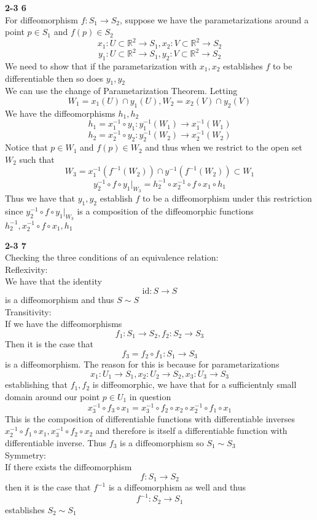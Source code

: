 \documentclass[12pt]{article}
\newenvironment{ques}[1]{\textbf{#1}\vspace{1 mm}\\ }{\bigskip}
\theoremstyle{definition}
\newcommand{\R}{\mathbb R}
\newcommand{\id}{\text{id}}
\begin{document}
\begin{ques}{2-3 6}
	For diffeomorphism $f: S_1 \to S_2$, suppose we have the parametarizations
	around a point $p \in S_1$ and $f(p) \in S_2$
	$$x_1: U \subset \R^2 \to S_1, x_2: V \subset \R^2 \to S_2$$
	$$y_1: U \subset \R^2 \to S_1, y_2: V \subset \R^2 \to S_2$$
	We need to show that if the parametarization with $x_1, x_2$ establishes
	$f$ to be differentiable then so does $y_1, y_2$\\
	We can use the change of Parametarization Theorem. Letting 
	$$W_1 = x_1(U) \cap y_1(U), W_2 = x_2(V) \cap y_2(V)$$
	We have the diffeomorphisms $h_1, h_2$
	$$h_1 = x_1^{-1} \circ y_1: y_1^{-1}(W_1) \to x_1^{-1}(W_1)$$
	$$h_2 = x_2^{-1} \circ y_2: y_2^{-1}(W_2) \to x_2^{-1}(W_2)$$
	Notice that $p \in W_1$ and $f(p) \in W_2$ and thus when we restrict to the
	open set $W_2$ such that 
	$$W_3 = x_1^{-1}(f^{-1}(W_2))\cap y^{-1}(f^{-1}(W_2)) \subset W_1$$
	$$y_2^{-1} \circ f \circ y_1|_{W_3} = h_2^{-1} \circ x_2^{-1} \circ f \circ x_1
	\circ h_1$$
	Thus we have that $y_1, y_2$ establish $f$ to be a diffeomorphism under
	this restriction since $y_2^{-1} \circ f \circ y_1|_{W_3}$ is a composition
	of the diffeomorphic functions $h_2^{-1}, x_2^{-1} \circ f \circ x_1, h_1$
\end{ques}

\begin{ques}{2-3 7}
	Checking the three conditions of an equivalence relation:\\
	Reflexivity:\\
	We have that the identity 
	$$\id : S \to S$$
	is a diffeomorphism and thus $S \sim S$\\
	Transitivity:\\
	If we have the diffeomorphisms
	$$f_1:S_1 \to S_2, f_2:S_2 \to S_3$$
	Then it is the case that 
	$$f_3 = f_2 \circ f_1 :S_1 \to S_3$$
	is a diffeomorphism. The reason for this is because for parametarizations
	$$x_1: U_1 \to S_1, x_2: U_2 \to S_2, x_3:U_3 \to S_3$$
	establishing that $f_1, f_2$ is diffeomorphic, we have that for a
	sufficientnly small domain around our point $p \in U_1$ in question
	$$x_3^{-1} \circ f_3 \circ x_1 = x_3^{-1} \circ f_2 \circ x_2 \circ
	x_2^{-1} \circ f_1 \circ x_1$$
	This is the composition of differentiable functions with differentiable
	inverses $x_2^{-1} \circ f_1 \circ x_1, x_3^{-1} \circ f_2 \circ x_2$ and
	therefore is itself a differentiable function with differentiable inverse.
	Thus $f_3$ is a diffeomorphism so $S_1 \sim S_3$\\
	Symmetry:\\
	If there exists the diffeomorphism
	$$f:S_1 \to S_2$$
	then it is the case that $f^{-1}$ is a diffeomorphism as well and thus
	$$f^{-1}:S_2 \to S_1$$
	establishes $S_2 \sim S_1$
\end{ques}
\end{document}
